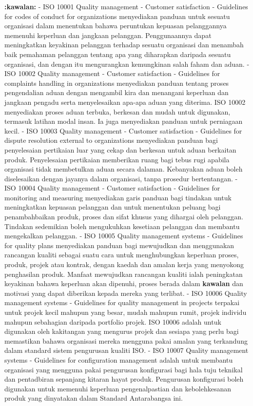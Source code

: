 \documentclass{article}
\begin{document}
\textbf{:kawalan:} - ISO 10001 Quality management - Customer satisfaction - Guidelines for codes of
 conduct for organizations menyediakan panduan untuk sesuatu organisasi dalam
 menentukan bahawa peruntukan kepuasan pelanggannya memenuhi keperluan dan
 jangkaan pelanggan. Penggunaannya dapat meningkatkan keyakinan pelanggan
 terhadap sesuatu organisasi dan menambah baik pemahaman pelanggan tentang apa
 yang diharapkan daripada sesuatu organisasi, dan dengan itu mengurangkan
 kemungkinan salah faham dan aduan.
- ISO 10002 Quality management - Customer satisfaction - Guidelines for complaints
 handling in organizations menyediakan panduan tentang proses pengendalian aduan
 dengan mengambil kira dan menangani keperluan dan jangkaan pengadu serta
 menyelesaikan apa-apa aduan yang diterima. ISO 10002 menyediakan proses aduan
 terbuka, berkesan dan mudah untuk digunakan, termasuk latihan modal insan. Ia juga
 menyediakan panduan untuk perniagaan kecil.
- ISO 10003 Quality management - Customer satisfaction - Guidelines for dispute
 resolution external to organizations menyediakan panduan bagi penyelesaian pertikaian
 luar yang cekap dan berkesan untuk aduan berkaitan produk. Penyelesaian pertikaian
 memberikan ruang bagi tebus rugi apabila organisasi tidak membetulkan aduan secara
 dalaman. Kebanyakan aduan boleh diselesaikan dengan jayanya dalam organisasi,
 tanpa prosedur bertentangan.
- ISO 10004 Quality management - Customer satisfaction - Guidelines for monitoring and
 measuring menyediakan garis panduan bagi tindakan untuk meningkatkan kepuasan
 pelanggan dan untuk menentukan peluang bagi penambahbaikan produk, proses dan
 sifat khusus yang dihargai oleh pelanggan. Tindakan sedemikian boleh mengukuhkan
 kesetiaan pelanggan dan membantu mengekalkan pelanggan.
- ISO 10005 Quality management systems - Guidelines for quality plans menyediakan
 panduan bagi mewujudkan dan menggunakan rancangan kualiti sebagai suatu cara
 untuk menghubungkan keperluan proses, produk, projek atau kontrak, dengan kaedah
 dan amalan kerja yang menyokong penghasilan produk. Manfaat mewujudkan rancangan
 kualiti ialah peningkatan keyakinan bahawa keperluan akan dipenuhi, proses berada
 dalam \textbf{kawalan} dan motivasi yang dapat diberikan kepada mereka yang terlibat.
- ISO 10006 Quality management systems - Guidelines for quality management in projects
 terpakai untuk projek kecil mahupun yang besar, mudah mahupun rumit, projek individu
 mahupun sebahagian daripada portfolio projek. ISO 10006 adalah untuk digunakan oleh
 kakitangan yang mengurus projek dan sesiapa yang perlu bagi memastikan bahawa
 organisasi mereka mengguna pakai amalan yang terkandung dalam standard sistem
 pengurusan kualiti ISO.
- ISO 10007 Quality management systems - Guidelines for configuration management
 adalah untuk membantu organisasi yang mengguna pakai pengurusan konfigurasi bagi
 hala tuju teknikal dan pentadbiran sepanjang kitaran hayat produk. Pengurusan
 konfigurasi boleh digunakan untuk memenuhi keperluan pengenalpastian dan
 kebolehkesanan produk yang dinyatakan dalam Standard Antarabangsa ini.
\end{document}
